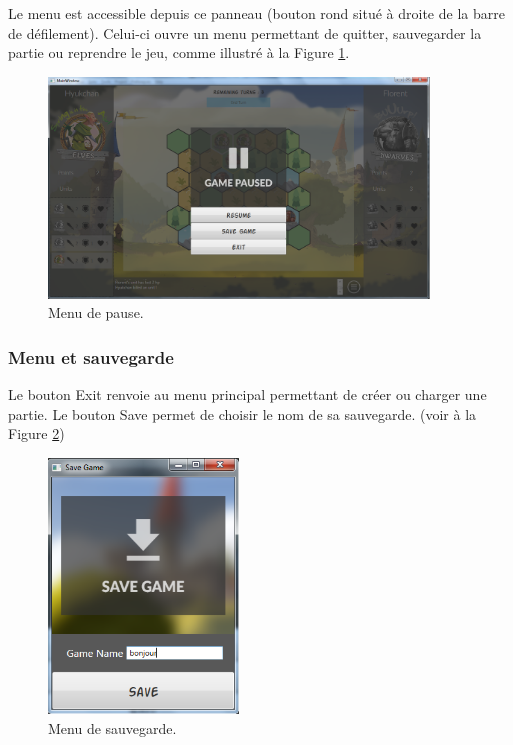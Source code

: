 \documentclass[a4paper]{article}
\begin{document}
		Le menu est accessible depuis ce panneau (bouton rond situé à droite de la barre de défilement). Celui-ci ouvre un menu permettant de quitter, sauvegarder la partie ou reprendre le jeu, comme illustré à la Figure \ref{fig:menu}.
		\begin{figure}[h!]
			\centering
			\includegraphics[width=0.9\textwidth]{../../IHM/menu.png}
			\caption{Menu de pause.}
			\label{fig:menu}
		\end{figure}

		\subsubsection{Menu et sauvegarde}
		Le bouton \og Exit \fg{} renvoie au menu principal permettant de créer ou charger une partie. Le bouton \og Save \fg{} permet de choisir le nom de sa sauvegarde. (voir à la Figure \ref{fig:save})
		\begin{figure}[h!]
			\centering
			\includegraphics[width=0.45\textwidth]{../../IHM/save.png}
			\caption{Menu de sauvegarde.}
			\label{fig:save}
		\end{figure}
\end{document}
